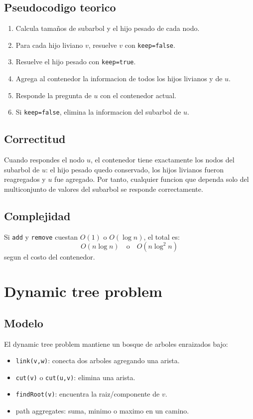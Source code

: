 \documentclass[10pt]{article}
\newcommand{\bigO}{O}
\begin{document}
\subsection{Pseudocodigo teorico}
\begin{enumerate}[leftmargin=*]
\item Calcula tamaños de subarbol y el hijo pesado de cada nodo.
\item Para cada hijo liviano $v$, resuelve $v$ con \texttt{keep=false}.
\item Resuelve el hijo pesado con \texttt{keep=true}.
\item Agrega al contenedor la informacion de todos los hijos livianos y de $u$.
\item Responde la pregunta de $u$ con el contenedor actual.
\item Si \texttt{keep=false}, elimina la informacion del subarbol de $u$.
\end{enumerate}

\subsection{Correctitud}
Cuando respondes el nodo $u$, el contenedor tiene exactamente los nodos del
subarbol de $u$: el hijo pesado quedo conservado, los hijos livianos fueron
reagregados y $u$ fue agregado. Por tanto, cualquier funcion que dependa solo
del multiconjunto de valores del subarbol se responde correctamente.

\subsection{Complejidad}
Si \texttt{add} y \texttt{remove} cuestan $\bigO(1)$ o $\bigO(\log n)$, el total
es:
\[
\bigO(n\log n)\quad\text{o}\quad \bigO(n\log^2 n)
\]
segun el costo del contenedor.

\newpage
\section{Dynamic tree problem}

\subsection{Modelo}
El dynamic tree problem mantiene un bosque de arboles enraizados bajo:
\begin{itemize}[leftmargin=*]
\item \texttt{link(v,w)}: conecta dos arboles agregando una arista.
\item \texttt{cut(v)} o \texttt{cut(u,v)}: elimina una arista.
\item \texttt{findRoot(v)}: encuentra la raiz/componente de $v$.
\item path aggregates: suma, minimo o maximo en un camino.
\end{itemize}
\end{document}
